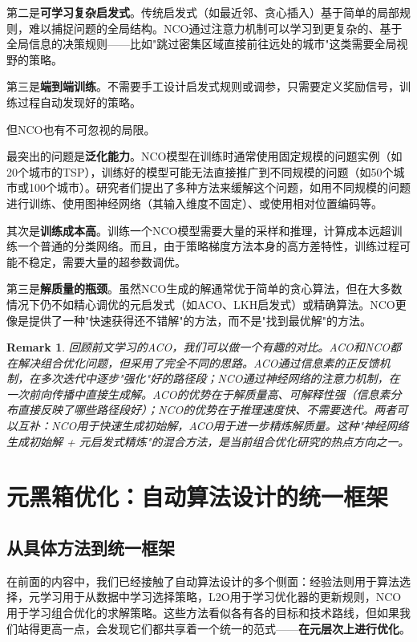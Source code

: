 \documentclass[lang=cn,zihao=-4,a4paper,fontset=windows]{beautybook}
\newtheorem*{remark}{\textbf{Remark}}
\begin{document}
第二是\textbf{可学习复杂启发式}。传统启发式（如最近邻、贪心插入）基于简单的局部规则，难以捕捉问题的全局结构。NCO通过注意力机制可以学习到更复杂的、基于全局信息的决策规则——比如"跳过密集区域直接前往远处的城市"这类需要全局视野的策略。

第三是\textbf{端到端训练}。不需要手工设计启发式规则或调参，只需要定义奖励信号，训练过程自动发现好的策略。

但NCO也有不可忽视的局限。

最突出的问题是\textbf{泛化能力}。NCO模型在训练时通常使用固定规模的问题实例（如20个城市的TSP），训练好的模型可能无法直接推广到不同规模的问题（如50个城市或100个城市）。研究者们提出了多种方法来缓解这个问题，如用不同规模的问题进行训练、使用图神经网络（其输入维度不固定）、或使用相对位置编码等。

其次是\textbf{训练成本高}。训练一个NCO模型需要大量的采样和推理，计算成本远超训练一个普通的分类网络。而且，由于策略梯度方法本身的高方差特性，训练过程可能不稳定，需要大量的超参数调优。

第三是\textbf{解质量的瓶颈}。虽然NCO生成的解通常优于简单的贪心算法，但在大多数情况下仍不如精心调优的元启发式（如ACO、LKH启发式）或精确算法。NCO更像是提供了一种"快速获得还不错解"的方法，而不是"找到最优解"的方法。

\begin{remark}
回顾前文学习的ACO，我们可以做一个有趣的对比。ACO和NCO都在解决组合优化问题，但采用了完全不同的思路。ACO通过信息素的正反馈机制，在多次迭代中逐步"强化"好的路径段；NCO通过神经网络的注意力机制，在一次前向传播中直接生成解。ACO的优势在于解质量高、可解释性强（信息素分布直接反映了哪些路径段好）；NCO的优势在于推理速度快、不需要迭代。两者可以互补：NCO用于快速生成初始解，ACO用于进一步精炼解质量。这种"神经网络生成初始解 + 元启发式精炼"的混合方法，是当前组合优化研究的热点方向之一。
\end{remark}

\section{元黑箱优化：自动算法设计的统一框架}

\subsection{从具体方法到统一框架}

在前面的内容中，我们已经接触了自动算法设计的多个侧面：经验法则用于算法选择，元学习用于从数据中学习选择策略，L2O用于学习优化器的更新规则，NCO用于学习组合优化的求解策略。这些方法看似各有各的目标和技术路线，但如果我们站得更高一点，会发现它们都共享着一个统一的范式——\textbf{在元层次上进行优化}。
\end{document}
